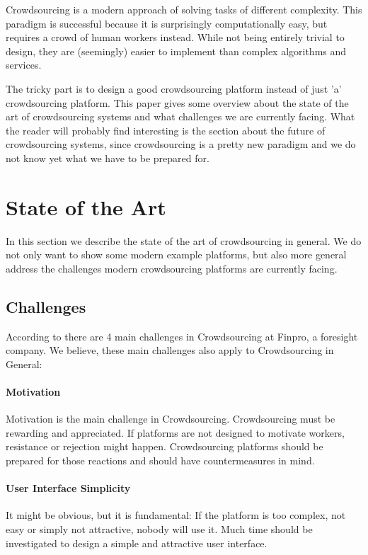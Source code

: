\documentclass{sig-alternate}
\begin{document}
Crowdsourcing is a modern approach of solving tasks of different complexity. This paradigm is successful because it is surprisingly computationally easy, but requires a crowd 
of human workers instead. While not being entirely trivial to design, they are (seemingly) easier to implement than complex algorithms and services.

The tricky part is to design a good crowdsourcing platform instead of just 'a' crowdsourcing platform. 
This paper gives some overview about the state of the art of crowdsourcing systems and what challenges we are currently facing. 
What the reader will probably find interesting is the section about the future of crowdsourcing systems, since crowdsourcing is a pretty new paradigm and we do not know yet what 
we have to be prepared for.

\section{State of the Art}

In this section we describe the state of the art of crowdsourcing in general. We do not only want to show some modern example platforms, but also more general address
the challenges modern crowdsourcing platforms are currently facing.

\subsection{Challenges}

According to \cite{r} there are 4 main challenges in Crowdsourcing at Finpro, a foresight company. We believe, these
main challenges also apply to Crowdsourcing in General:

\paragraph{Motivation}
Motivation is the main challenge in Crowdsourcing. Crowdsourcing must be rewarding and appreciated. If platforms
are not designed to motivate workers, resistance or rejection might happen. Crowdsourcing platforms should be prepared
for those reactions and should have countermeasures in mind.

\paragraph{User Interface Simplicity}
It might be obvious, but it is fundamental: If the platform is too complex, not easy or simply not attractive, nobody will use it.
Much time should be investigated to design a simple and attractive user interface.
\end{document}
